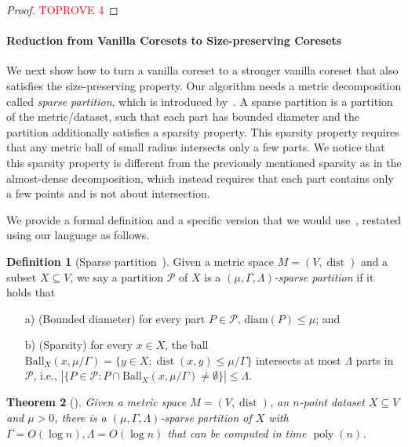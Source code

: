 \documentclass[letterpaper,11pt]{article}
\theoremstyle{plain}
\newtheorem{theorem}{Theorem}[section]
\theoremstyle{definition}
\newtheorem{definition}[theorem]{Definition}
\theoremstyle{remark}
\DeclareMathOperator{\poly}{poly}
\DeclareMathOperator{\dist}{dist}
\newcommand{\diam}{\mathrm{diam}}
\newcommand{\calP}{\mathcal{P}}
\newcommand{\ball}{\mathrm{Ball}}
\begin{document}
\begin{proof}\textcolor{red}{TOPROVE 4}\end{proof}
\paragraph{Reduction from Vanilla Coresets to Size-preserving Coresets}
We next show how to turn a vanilla coreset to a stronger vanilla coreset that also satisfies the size-preserving property.
Our algorithm needs a metric decomposition called \emph{sparse partition}, which is introduced by~\cite{Jia05Universal}.
A sparse partition is a partition of the metric/dataset,
such that each part has bounded diameter and the partition additionally satisfies a sparsity property.
This sparsity property requires that any metric ball of small radius intersects only a few parts.
We notice that this sparsity property is different from the previously mentioned sparsity as in the almost-dense decomposition, which instead requires that each part contains only a few points and is not about intersection.

We provide a formal definition and a specific version that we would use~\cite{Jia05Universal}, restated using our language as follows.



\begin{definition}[Sparse partition~\cite{Jia05Universal}]
    \label{def:sparse partition}
    Given a metric space $M=(V,\dist)$ and a subset $X\subseteq V$, we say a partition $\calP$ of $X$ is a \emph{$(\mu,\Gamma,\Lambda)$-sparse partition} if it holds that 
    \begin{itemize}
        \item[a)] (Bounded diameter) for every part $P\in \calP$, $\diam(P)\le \mu$; and
        \item[b)] (Sparsity) for every $x\in X$, the ball $\ball_X(x,\mu/\Gamma)=\{y\in X:\dist(x,y)\le \mu/\Gamma\}$ intersects at most $\Lambda$ parts in $\calP$, i.e., $|\{P\in\calP: P\cap \ball_X(x,\mu/\Gamma)\neq\emptyset\}|\le \Lambda$.
    \end{itemize}
\end{definition}


\begin{theorem}[\cite{Jia05Universal}]
    \label{thm:sparse partition}
    Given a metric space $M=(V,\dist)$, an $n$-point dataset $X\subseteq V$ and $\mu > 0$, there is a $(\mu,\Gamma,\Lambda)$-sparse partition of $X$ with $\Gamma = O(\log n), \Lambda = O(\log n)$ that can be computed in time $\poly(n)$.
\end{theorem}
\end{document}

